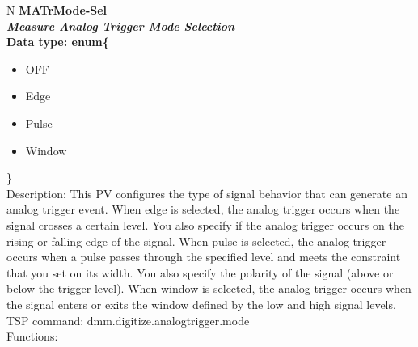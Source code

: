 \documentclass[openany]{article}
\begin{document}
		\begin{tabular}{N}
			\hline
			\bfseries MATrMode-Sel\label{pv:matrmode-sel} \\ \hline
			\emph{Measure Analog Trigger Mode Selection} \\
			Data type: enum\{\begin{itemize}[noitemsep]
				\small
				\item[] OFF
				\item[] Edge
				\item[] Pulse
				\item[] Window
			\end{itemize}\} \\
			Description: This PV configures the type of signal behavior that can generate an analog trigger event. When edge is selected, the analog trigger occurs when the signal crosses a certain level. You also specify if the analog trigger occurs on the rising or falling edge of the signal. When pulse is selected, the analog trigger occurs when a pulse passes through the specified level and meets the constraint that you set on its width. You also specify the polarity of the signal (above or below the trigger level). When window is selected, the analog trigger occurs when the signal enters or exits the window defined by the low and high signal levels. \\
			TSP command: dmm.digitize.analogtrigger.mode \\
			Functions: \\
			\arrayrulecolor{\FuncTableBorderColor}

		\end{tabular}
\end{document}
